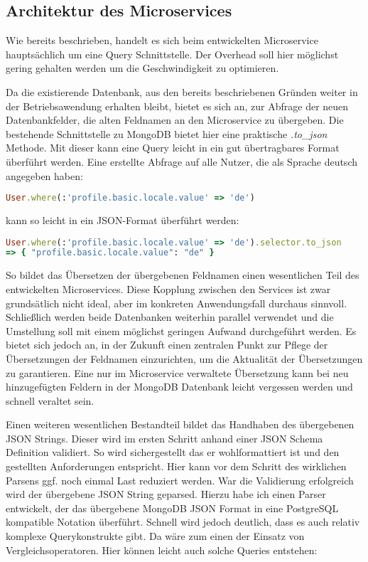
\subsection{Architektur des Microservices}
Wie bereits beschrieben, handelt es sich beim entwickelten Microservice hauptsächlich um eine Query Schnittstelle. Der Overhead soll hier möglichst gering gehalten werden um die Geschwindigkeit zu optimieren.

Da die existierende Datenbank, aus den bereits beschriebenen Gründen weiter in der Betriebsawendung erhalten bleibt, bietet es sich an, zur Abfrage der neuen Datenbankfelder, die alten Feldnamen an den Microservice zu übergeben.
Die bestehende Schnittstelle zu MongoDB bietet hier eine praktische \textit{.to\_json} Methode. Mit dieser kann eine Query leicht in ein gut übertragbares Format überführt werden. Eine erstellte Abfrage auf alle Nutzer, die als Sprache deutsch angegeben haben:

\begin{lstlisting}[language=Ruby]
User.where(:'profile.basic.locale.value' => 'de')
\end{lstlisting}

\noindent kann so leicht in ein JSON-Format überführt werden:

\begin{lstlisting}[language=Ruby]
User.where(:'profile.basic.locale.value' => 'de').selector.to_json
=> { "profile.basic.locale.value": "de" }
\end{lstlisting}

\noindent So bildet das Übersetzen der übergebenen Feldnamen einen wesentlichen Teil des entwickelten Microservices.
Diese Kopplung zwischen den Services ist zwar grundsätlich nicht ideal, aber im konkreten Anwendungsfall durchaus sinnvoll. Schließlich werden beide Datenbanken weiterhin parallel verwendet und die Umstellung soll mit einem möglichst geringen Aufwand durchgeführt werden.
Es bietet sich jedoch an, in der Zukunft einen zentralen Punkt zur Pflege der Übersetzungen der Feldnamen einzurichten, um die Aktualität der Übersetzungen zu garantieren. Eine nur im Microservice verwaltete Übersetzung kann bei neu hinzugefügten Feldern in der MongoDB Datenbank leicht vergessen werden und schnell veraltet sein.

Einen weiteren wesentlichen Bestandteil bildet das Handhaben des übergebenen JSON Strings. Dieser wird im ersten Schritt anhand einer JSON Schema \cite{jsonschema} Definition validiert. So wird sichergestellt das er wohlformattiert ist und den gestellten Anforderungen entspricht. Hier kann vor dem Schritt des wirklichen Parsens ggf. noch einmal Last reduziert werden. War die Validierung erfolgreich wird der übergebene JSON String geparsed. Hierzu habe ich einen Parser entwickelt, der das übergebene MongoDB JSON Format in eine PostgreSQL kompatible Notation überführt. Schnell wird jedoch deutlich, dass es auch relativ komplexe Querykonstrukte gibt. Da wäre zum einen der Einsatz von Vergleichsoperatoren. Hier können leicht auch solche Queries entstehen:

